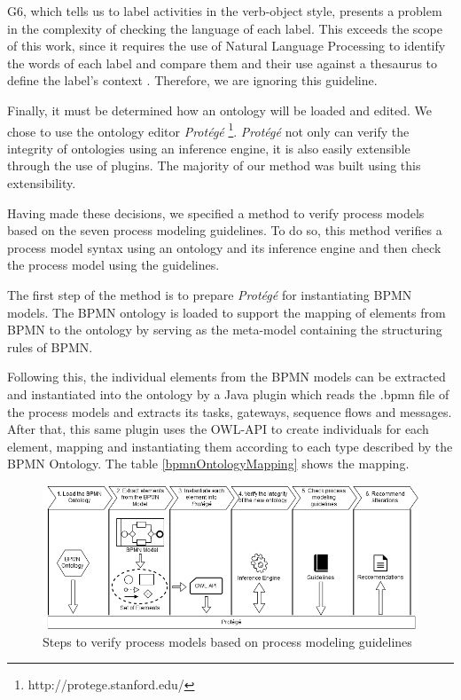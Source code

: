 \documentclass[a4paper,twoside]{article}
\begin{document}
G6, which tells us to label activities in the verb-object style, presents a problem in the complexity of checking the language of each label. This exceeds the scope of this work, since it requires the use of Natural Language Processing to identify the words of each label and compare them and their use against a thesaurus to define the label's context \cite{Gassen2014}. Therefore, we are ignoring this guideline.



Finally, it must be determined how an ontology will be loaded and edited. We chose to use the ontology editor \textit{Protégé} \footnote{http://protege.stanford.edu/}. \textit{Protégé} not only can verify the integrity of ontologies using an inference engine, it is also easily extensible through the use of plugins. The majority of our method was built using this extensibility. %

\noindent Having made these decisions, we specified a method to verify process models based on the seven process modeling guidelines. To do so, this method verifies a process model syntax using an ontology and its inference engine and then check the process model using the guidelines.

The first step of the method is to prepare \textit{Protégé} for instantiating BPMN models. The BPMN ontology is loaded to support the mapping of elements from BPMN to the ontology by serving as the meta-model containing the structuring rules of BPMN.

Following this, the individual elements from the BPMN models can be extracted and instantiated into the ontology by a Java plugin which reads the .bpmn file of the process models and extracts its tasks, gateways, sequence flows and messages. After that, this same plugin uses the OWL-API to create individuals for each element, mapping and instantiating them according to each type described by the BPMN Ontology. The table \ref{bpmnOntologyMapping} shows the mapping.

\begin{figure}
	\includegraphics[width=\textwidth ]{method.png}
	\caption{Steps to verify process models based on process modeling guidelines}
	\label{methodFigure}
\end{figure}
\end{document}
